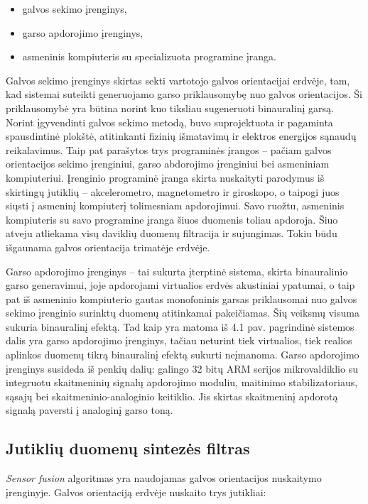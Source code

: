 \documentclass[]{vgtuef}
\begin{document}
\begin{itemize}
\item galvos sekimo įrenginys,
\item garso apdorojimo įrenginys,
\item asmeninis kompiuteris su specializuota programine įranga.
\end{itemize}

Galvos sekimo įrenginys skirtas sekti vartotojo galvos orientacijai erdvėje, tam, kad sistemai suteikti generuojamo garso priklausomybę nuo galvos orientacijos. Ši priklausomybė yra būtina norint kuo tiksliau sugeneruoti binauralinį garsą. Norint įgyvendinti galvos sekimo metodą, buvo suprojektuota ir pagaminta spausdintinė plokštė, atitinkanti fizinių išmatavimų ir elektros energijos sąnaudų reikalavimus. Taip pat parašytos trys programinės įrangos – pačiam galvos orientacijos sekimo įrenginiui, garso abdorojimo įrenginiui bei asmeniniam kompiuteriui. Įrenginio programinė įranga skirta nuskaityti parodymus iš skirtingų jutiklių – akcelerometro, magnetometro ir giroskopo, o taipogi juos siųsti į asmeninį kompiuterį tolimesniam apdorojimui. Savo ruožtu, asmeninis kompiuteris su savo programine įranga šiuos duomenis toliau apdoroja. Šiuo atveju atliekama visų daviklių duomenų filtracija ir sujungimas. Tokiu būdu išgaunama galvos orientacija trimatėje erdvėje.

Garso apdorojimo įrenginys – tai sukurta įterptinė sistema, skirta binauralinio garso generavimui, joje apdorojami virtualios erdvės akustiniai ypatumai, o taip pat iš asmeninio kompiuterio gautas monofoninis garsas priklausomai nuo galvos sekimo įrenginio surinktų duomenų atitinkamai pakeičiamas. Šių veiksmų visuma sukuria binauralinį efektą. Tad kaip yra matoma iš 4.1 pav. pagrindinė sistemos dalis yra garso apdorojimo įrenginys, tačiau neturint tiek virtualios, tiek realios aplinkos duomenų tikrą binauralinį efektą sukurti neįmanoma. Garso apdorojimo įrenginys susideda iš penkių dalių: galingo 32 bitų ARM serijos mikrovaldiklio su integruotu skaitmeninių signalų apdorojimo moduliu, maitinimo stabilizatoriaus, sąsajų bei skaitmeninio-analoginio keitiklio. Jis skirtas skaitmeninį apdorotą signalą paversti į analoginį garso toną. 

\subsection{Jutiklių duomenų sintezės filtras}

\textit{Sensor fusion} algoritmas yra naudojamas galvos orientacijos nuskaitymo įrenginyje. Galvos orientaciją erdvėje nuskaito trys jutikliai: 
\end{document}
